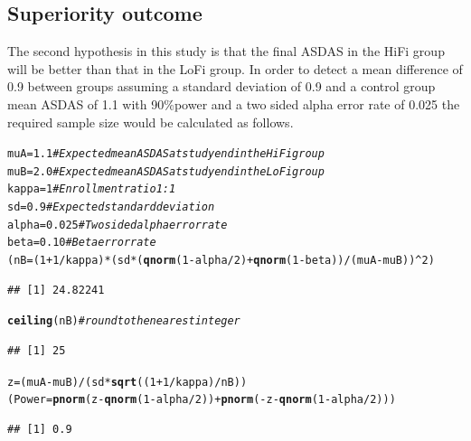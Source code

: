 \documentclass{article}\usepackage[]{graphicx}\usepackage[]{color}
\makeatletter
\newcommand{\hlnum}[1]{\textcolor[rgb]{0.686,0.059,0.569}{#1}}%
\newcommand{\hlcom}[1]{\textcolor[rgb]{0.678,0.584,0.686}{\textit{#1}}}%
\newcommand{\hlopt}[1]{\textcolor[rgb]{0,0,0}{#1}}%
\newcommand{\hlstd}[1]{\textcolor[rgb]{0.345,0.345,0.345}{#1}}%
\newcommand{\hlkwb}[1]{\textcolor[rgb]{0.69,0.353,0.396}{#1}}%
\newcommand{\hlkwd}[1]{\textcolor[rgb]{0.737,0.353,0.396}{\textbf{#1}}}%
\newenvironment{kframe}{%
 \def\at@end@of@kframe{}%
 \ifinner\ifhmode%
  \def\at@end@of@kframe{\end{minipage}}%
  \begin{minipage}{\columnwidth}%
 \fi\fi%
 \def\FrameCommand##1{\hskip\@totalleftmargin \hskip-\fboxsep
 \colorbox{shadecolor}{##1}\hskip-\fboxsep
     \hskip-\linewidth \hskip-\@totalleftmargin \hskip\columnwidth}%
 \MakeFramed {\advance\hsize-\width
   \@totalleftmargin\z@ \linewidth\hsize
   \@setminipage}}%
 {\par\unskip\endMakeFramed%
 \at@end@of@kframe}
\newenvironment{knitrout}{}{} %
\makeatother
\begin{document}
\subsection{Superiority outcome}

The second hypothesis in this study is that the final ASDAS in the HiFi group will be better than that in the LoFi group. In order to detect a mean difference of 0.9 between groups assuming a standard deviation of 0.9 and a control group mean ASDAS of 1.1 with 90\%power and a two sided alpha error rate of 0.025 the required sample size would be calculated as follows.
\begin{knitrout}
\color{fgcolor}\begin{kframe}
\begin{alltt}
\hlstd{muA}\hlkwb{=}\hlnum{1.1} \hlcom{#Expected mean ASDAS at study end in the HiFi group}
\hlstd{muB}\hlkwb{=}\hlnum{2.0} \hlcom{#Expected mean ASDAS at study end in the LoFi group}
\hlstd{kappa}\hlkwb{=}\hlnum{1} \hlcom{#Enrollment ratio 1:1}
\hlstd{sd}\hlkwb{=}\hlnum{0.9} \hlcom{# Expected standard deviation}
\hlstd{alpha}\hlkwb{=}\hlnum{0.025} \hlcom{#Two sided alpha error rate}
\hlstd{beta}\hlkwb{=}\hlnum{0.10} \hlcom{#Beta error rate}
\hlstd{(nB}\hlkwb{=}\hlstd{(}\hlnum{1}\hlopt{+}\hlnum{1}\hlopt{/}\hlstd{kappa)}\hlopt{*}\hlstd{(sd}\hlopt{*}\hlstd{(}\hlkwd{qnorm}\hlstd{(}\hlnum{1}\hlopt{-}\hlstd{alpha}\hlopt{/}\hlnum{2}\hlstd{)}\hlopt{+}\hlkwd{qnorm}\hlstd{(}\hlnum{1}\hlopt{-}\hlstd{beta))}\hlopt{/}\hlstd{(muA}\hlopt{-}\hlstd{muB))}\hlopt{^}\hlnum{2}\hlstd{)}
\end{alltt}
\begin{verbatim}
## [1] 24.82241
\end{verbatim}
\begin{alltt}
\hlkwd{ceiling}\hlstd{(nB)} \hlcom{# round to the nearest integer}
\end{alltt}
\begin{verbatim}
## [1] 25
\end{verbatim}
\begin{alltt}
\hlstd{z}\hlkwb{=}\hlstd{(muA}\hlopt{-}\hlstd{muB)}\hlopt{/}\hlstd{(sd}\hlopt{*}\hlkwd{sqrt}\hlstd{((}\hlnum{1}\hlopt{+}\hlnum{1}\hlopt{/}\hlstd{kappa)}\hlopt{/}\hlstd{nB))}
\hlstd{(Power}\hlkwb{=}\hlkwd{pnorm}\hlstd{(z}\hlopt{-}\hlkwd{qnorm}\hlstd{(}\hlnum{1}\hlopt{-}\hlstd{alpha}\hlopt{/}\hlnum{2}\hlstd{))}\hlopt{+}\hlkwd{pnorm}\hlstd{(}\hlopt{-}\hlstd{z}\hlopt{-}\hlkwd{qnorm}\hlstd{(}\hlnum{1}\hlopt{-}\hlstd{alpha}\hlopt{/}\hlnum{2}\hlstd{)))}
\end{alltt}
\begin{verbatim}
## [1] 0.9
\end{verbatim}
\end{kframe}
\end{knitrout}
\end{document}
